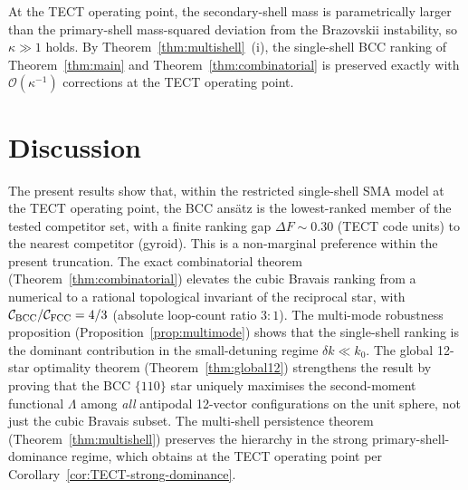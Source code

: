 \begin{corollary}
\label{cor:TECT-strong-dominance}
At the TECT operating point, the secondary-shell mass is
parametrically larger than the primary-shell mass-squared deviation
from the Brazovskii instability, so $\kappa \gg 1$ holds. By
Theorem~\ref{thm:multishell}~(i), the single-shell BCC ranking of
Theorem~\ref{thm:main} and Theorem~\ref{thm:combinatorial} is
preserved exactly with $\mathcal{O}(\kappa^{-1})$ corrections at the
TECT operating point.
\end{corollary}

\section{Discussion}\label{sec:discussion}

The present results show that, within the restricted single-shell
SMA model at the TECT operating point, the BCC ans\"atz is the
lowest-ranked member of the tested competitor set, with a finite
ranking gap $\Delta F \sim 0.30$ (TECT code units) to the nearest
competitor (gyroid). This is a non-marginal preference within the
present truncation. The exact combinatorial theorem
(Theorem~\ref{thm:combinatorial}) elevates the cubic Bravais ranking
from a numerical to a rational topological invariant of the reciprocal
star, with $\mathcal{C}_{\rm BCC}/\mathcal{C}_{\rm FCC} = 4/3$
(absolute loop-count ratio $3:1$). The multi-mode robustness
proposition (Proposition~\ref{prop:multimode}) shows that the
single-shell ranking is the dominant contribution in the
small-detuning regime $\delta k \ll k_0$. The global 12-star
optimality theorem (Theorem~\ref{thm:global12}) strengthens the result
by proving that the BCC $\{110\}$ star uniquely maximises the
second-moment functional $\Lambda$ among \emph{all} antipodal
12-vector configurations on the unit sphere, not just the cubic
Bravais subset. The multi-shell persistence theorem
(Theorem~\ref{thm:multishell}) preserves the hierarchy in the strong
primary-shell-dominance regime, which obtains at the TECT operating
point per Corollary~\ref{cor:TECT-strong-dominance}.

